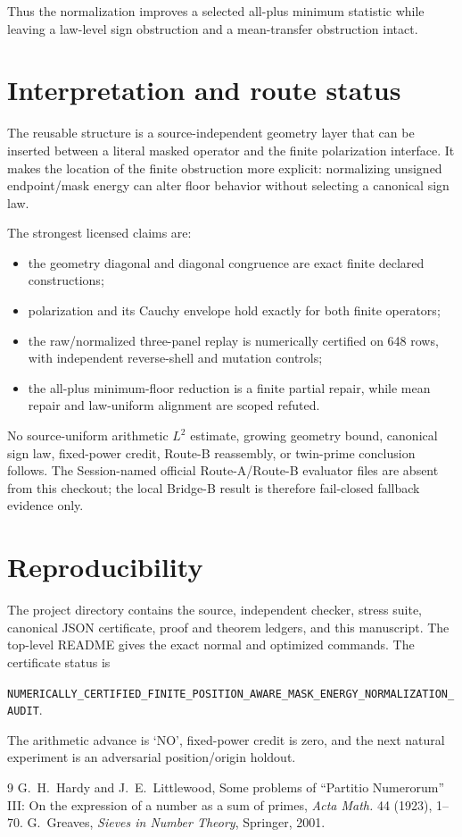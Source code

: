 \documentclass[10pt]{article}
\begin{document}
Thus the normalization improves a selected all-plus minimum statistic while
leaving a law-level sign obstruction and a mean-transfer obstruction intact.

\section{Interpretation and route status}

The reusable structure is a source-independent geometry layer that can be
inserted between a literal masked operator and the finite polarization
interface.  It makes the location of the finite obstruction more explicit:
normalizing unsigned endpoint/mask energy can alter floor behavior without
selecting a canonical sign law.

The strongest licensed claims are:
\begin{itemize}
\item the geometry diagonal and diagonal congruence are exact finite declared
  constructions;
\item polarization and its Cauchy envelope hold exactly for both finite
  operators;
\item the raw/normalized three-panel replay is numerically certified on 648
  rows, with independent reverse-shell and mutation controls;
\item the all-plus minimum-floor reduction is a finite partial repair, while
  mean repair and law-uniform alignment are scoped refuted.
\end{itemize}

No source-uniform arithmetic $L^2$ estimate, growing geometry bound,
canonical sign law, fixed-power credit, Route-B reassembly, or twin-prime
conclusion follows.  The Session-named official Route-A/Route-B evaluator
files are absent from this checkout; the local Bridge-B result is therefore
fail-closed fallback evidence only.

\section{Reproducibility}

The project directory contains the source, independent checker, stress suite,
canonical JSON certificate, proof and theorem ledgers, and this manuscript.
The top-level README gives the exact normal and optimized commands.  The
certificate status is
\begin{center}
\texttt{NUMERICALLY\_CERTIFIED\_FINITE\_POSITION\_AWARE\_MASK\_ENERGY\_NORMALIZATION\_AUDIT}.
\end{center}
The arithmetic advance is `NO', fixed-power credit is zero, and the next
natural experiment is an adversarial position/origin holdout.

\begin{thebibliography}{9}
G.~H.~Hardy and J.~E.~Littlewood,
Some problems of ``Partitio Numerorum'' III: On the expression of a number as
 a sum of primes, \emph{Acta Math.} 44 (1923), 1--70.
G.~Greaves, \emph{Sieves in Number Theory}, Springer, 2001.
\end{thebibliography}
\end{document}
